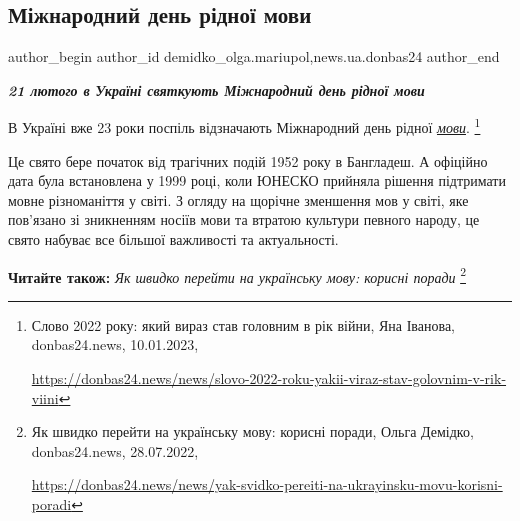  
 
 
 
 
 
\subsection{Міжнародний день рідної мови}
\label{sec:21_02_2023.stz.news.ua.donbas24.2.mizhn_den_ridnoj_movy}
 
\ifcmt
 author_begin
   author_id demidko_olga.mariupol,news.ua.donbas24
 author_end
\fi


\begin{center}
  \em\color{blue}\bfseries\Large
  21 лютого в Україні святкують Міжнародний день рідної мови
\end{center}


В Україні вже 23 роки поспіль відзначають Міжнародний день рідної \href{https://donbas24.news/news/slovo-2022-roku-yakii-viraz-stav-golovnim-v-rik-viini}{\emph{мови}}.%
\footnote{Слово 2022 року: який вираз став головним в рік війни, Яна Іванова, donbas24.news, 10.01.2023, \par\url{https://donbas24.news/news/slovo-2022-roku-yakii-viraz-stav-golovnim-v-rik-viini}}

Це свято бере початок від трагічних подій 1952 року в Бангладеш. А офіційно
дата була встановлена у 1999 році, коли ЮНЕСКО прийняла рішення підтримати
мовне різноманіття у світі. З огляду на щорічне зменшення мов у світі, яке
пов'язано зі зникненням носіїв мови та втратою культури певного народу, це
свято набуває все більшої важливості та актуальності.

\textbf{Читайте також:} \emph{Як швидко перейти на українську мову: корисні поради}%
\footnote{Як швидко перейти на українську мову: корисні поради, Ольга Демідко, donbas24.news, 28.07.2022, \par%
\url{https://donbas24.news/news/yak-svidko-pereiti-na-ukrayinsku-movu-korisni-poradi}%
}

